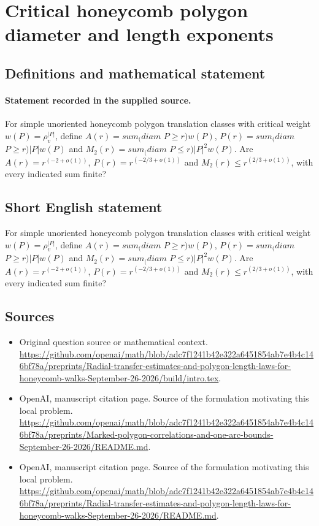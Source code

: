 \documentclass[11pt]{article}
\begin{document}
\section*{Critical honeycomb polygon diameter and length exponents}\label{30007369}
\subsection{Definitions and mathematical statement}
\paragraph{Statement recorded in the supplied source.}
For simple unoriented honeycomb polygon translation classes with critical weight $w(P)=\rho _v^{|P|}$, define $A(r)=sum_(diam$ $P\geq r)w(P)$, $P(r)=sum_(diam$ $P\geq r)|P|w(P)$ and $M_2(r)=sum_(diam$ $P\leq r)|P|^2w(P)$. Are $A(r)=r^(-2+o(1))$, $P(r)=r^(-2/3+o(1))$ and $M_2(r)\leq r^(2/3+o(1))$, with every indicated sum finite?
\subsection{Short English statement}
For simple unoriented honeycomb polygon translation classes with critical weight $w(P)=\rho _v^{|P|}$, define $A(r)=sum_(diam$ $P\geq r)w(P)$, $P(r)=sum_(diam$ $P\geq r)|P|w(P)$ and $M_2(r)=sum_(diam$ $P\leq r)|P|^2w(P)$. Are $A(r)=r^(-2+o(1))$, $P(r)=r^(-2/3+o(1))$ and $M_2(r)\leq r^(2/3+o(1))$, with every indicated sum finite?
\subsection{Sources}
\begin{itemize}
\item[S1] Original question source or mathematical context.
\url{https://github.com/openai/math/blob/adc7f1241b42e322a6451854ab7e4b4c146bf78a/preprints/Radial-transfer-estimates-and-polygon-length-laws-for-honeycomb-walks-September-26-2026/build/intro.tex}.
\item[S2] OpenAI, manuscript citation page. Source of the formulation motivating this local problem.
\url{https://github.com/openai/math/blob/adc7f1241b42e322a6451854ab7e4b4c146bf78a/preprints/Marked-polygon-correlations-and-one-arc-bounds-September-26-2026/README.md}.
\item[S3] OpenAI, manuscript citation page. Source of the formulation motivating this local problem.
\url{https://github.com/openai/math/blob/adc7f1241b42e322a6451854ab7e4b4c146bf78a/preprints/Radial-transfer-estimates-and-polygon-length-laws-for-honeycomb-walks-September-26-2026/README.md}.
\end{itemize}
\end{document}
